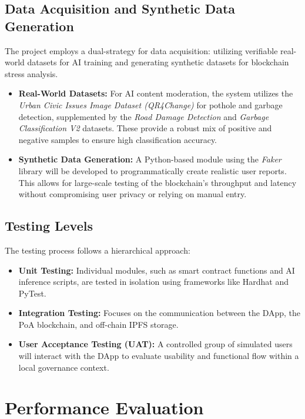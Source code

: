 \subsection{Data Acquisition and Synthetic Data Generation}
The project employs a dual-strategy for data acquisition: utilizing verifiable real-world datasets for AI training and generating synthetic datasets for blockchain stress analysis.

\begin{itemize}
    \item \textbf{Real-World Datasets:} For AI content moderation, the system utilizes the \textit{Urban Civic Issues Image Dataset (QR4Change)} for pothole and garbage detection, supplemented by the \textit{Road Damage Detection} and \textit{Garbage Classification V2} datasets. These provide a robust mix of positive and negative samples to ensure high classification accuracy.
    \item \textbf{Synthetic Data Generation:} A Python-based module using the \textit{Faker} library will be developed to programmatically create realistic user reports. This allows for large-scale testing of the blockchain's throughput and latency without compromising user privacy or relying on manual entry.
\end{itemize}

\subsection{Testing Levels}
The testing process follows a hierarchical approach:
\begin{itemize}
    \item \textbf{Unit Testing:} Individual modules, such as smart contract functions and AI inference scripts, are tested in isolation using frameworks like Hardhat and PyTest.
    \item \textbf{Integration Testing:} Focuses on the communication between the DApp, the PoA blockchain, and off-chain IPFS storage.
    \item \textbf{User Acceptance Testing (UAT):} A controlled group of simulated users will interact with the DApp to evaluate usability and functional flow within a local governance context.
\end{itemize}

\section{Performance Evaluation}
\label{sec:performance_evaluation}

